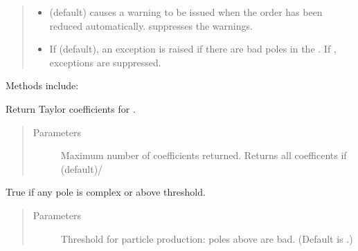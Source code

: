\documentclass[letterpaper,10pt,english]{sphinxmanual}
\begin{document}
\begin{fulllineitems}
\begin{quote}
\begin{description}
\begin{itemize}
\item {} 
 \textendash{}  (default) causes a warning to be issued
when the order has been reduced automatically. 
suppresses the warnings.

\item {} 
 \textendash{} If  (default), an exception is raised if there
are bad poles in the . If , exceptions are
suppressed.

\end{itemize}

\end{description}\end{quote}

Methods include:

\begin{fulllineitems}
\label{\detokenize{g2tools:g2tools.vacpol.taylor}}
Return Taylor coefficients for .
\begin{quote}\begin{description}
\item[{Parameters}] \leavevmode
{} \textendash{} Maximum number of coefficients returned. Returns
all coefficents if  (default)/

\end{description}\end{quote}

\end{fulllineitems}


\begin{fulllineitems}
\label{\detokenize{g2tools:g2tools.vacpol.badpoles}}
True if any pole is complex or above threshold.
\begin{quote}\begin{description}
\item[{Parameters}] \leavevmode
{} \textendash{} Threshold for particle production: poles above 
are bad. (Default is .)

\end{description}\end{quote}


\end{fulllineitems}
\end{fulllineitems}
\end{document}
